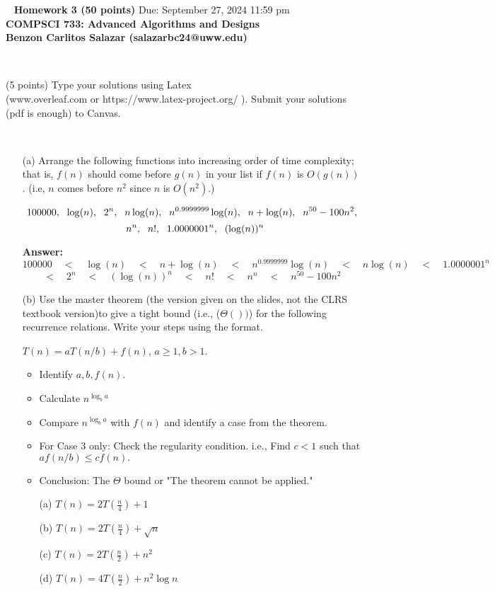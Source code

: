 \documentclass[12pt]{article}
\newcommand{\vs}{\vspace{2mm}}
\newcommand{\ls}{\vspace{5mm}}
\newcommand{\bc}{\begin{center}}
\newcommand{\ec}{\end{center}}
\newcommand{\ha}{\hspace{1mm}}
\begin{document}
\bc\ 
 { \bf Homework 3 (50 points)} Due: September 27, 2024 11:59 pm\\
 { \bf COMPSCI 733: Advanced Algorithms and Designs } \\ 
 { \bf Benzon Carlitos Salazar (salazarbc24@uww.edu) } 
\ec\
\ls\

 (5 points)
Type your solutions using Latex \\
(www.overleaf.com or https://www.latex-project.org/ ). Submit your solutions (pdf is enough)  to Canvas. 


\vs\


\begin{itemize}

\item[(a)]
Arrange the following functions into increasing order of time complexity; that is, $f(n)$ should come before $g(n)$ in your list if $f(n)$ is $O(g(n))$. (i.e, $n$ comes before $n^2$ since $n$ is $O(n^2)$.)
\vs\

\[100000 , \ha\ \log(n) ,   \ha\  2^n  , \ha\    n \log(n), \ha\   n^{0.9999999} \log(n) , \ha\  n+ \log(n),   \ha\   n^{50} - 100n^2,  \] 
\[ \ha\    n^n  , \ha\  n! , \ha\ 1.0000001^n, \ha\ (\log(n))^n\]

{\bf Answer:} 
\[
100000 \quad < \quad \log(n) \quad < \quad n + \log(n) \quad < \quad n^{0.9999999} \log(n) \quad < \quad n \log(n) \quad < \quad 1.0000001^n 
\]
\[
< \quad 2^n \quad < \quad (\log(n))^n \quad < \quad n! \quad < \quad n^n \quad < \quad n^{50} - 100n^2
\]

\item[(b)] Use the master theorem (the version given on the slides, not the CLRS textbook version)to give a tight bound (i.e., ($\Theta())$)  for the following recurrence relations. Write your steps using the format.
 
 $T(n)= aT(n/b)+f(n)$, $a \geq 1, b >1$.

\begin{itemize}
    \item Identify $a, b, f(n)$.
    \item Calculate $n^{\log_ba}$
    \item Compare $n^{\log_ba}$ with $f(n)$ and identify a case from the theorem.
    \item For Case 3 only: Check the regularity condition. i.e., Find $c<1$ such that $af(n/b) \leq c f(n).$
    \item Conclusion:  The $\Theta$ bound or "The theorem cannot be applied."
    
\end{itemize}

\begin{itemize}
    \item[(a)] $T(n) = 2 T(\frac{n}{4}) +1 $
    \item[(b)] $T(n) = 2 T(\frac{n}{4}) + \sqrt{n} $
    \item[(c)] $T(n) = 2 T(\frac{n}{2}) +n^2 $
    \item[(d)] $T(n) = 4T(\frac{n}{2}) + n^{2} \log n $
\end{itemize}
\end{itemize}
\end{document}
